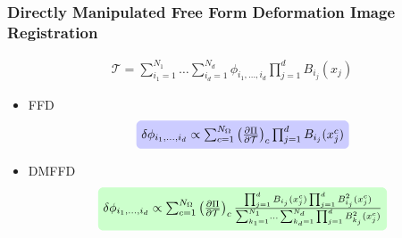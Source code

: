 \documentclass[xcolor=dvipsnames,serif,10pt]{beamer}
\begin{document}




\begin{frame}
\frametitle{Directly Manipulated Free Form Deformation Image Registration}
\begin{align*}
\mathcal{T} = \sum_{i_1=1}^{N_1}\ldots\sum_{i_d=1}^{N_d} \phi_{i_1,\ldots,i_d} \prod_{j=1}^d B_{i_j}(x_j) \nonumber
\end{align*}

\begin{itemize}
\item FFD
\begin{equation*}
\tikz[baseline]{
  \node[fill=blue!20,anchor=base,rounded corners, inner sep=4pt, inner ysep=4pt] (t1)
  {$\delta \phi_{i_1,\ldots,i_d} \propto \sum_{c=1}^{N_\Omega} \left( \frac{\partial \Pi}{\partial \mathcal{T}}\right)_c\prod_{j=1}^d B_{i_j}(x^c_j)$};
}  
\end{equation*}
\end{itemize}

\begin{itemize}
\item DMFFD
\begin{equation*}
\tikz[baseline]{
  \node[fill=green!20,anchor=base, rounded corners, inner sep=4pt, inner ysep=4pt] (t2)
{$\delta \phi_{i_1,\ldots,i_d} \propto \sum_{c=1}^{N_\Omega} \left( \frac{\partial \Pi}{\partial \mathcal{T}}\right)_c \frac{\prod_{j=1}^d B_{i_j}(x^c_j) \prod_{j=1}^d B_{i_j}^2 (x_j^c)}{\sum_{k_1=1}^{N_1}\ldots\sum_{k_d=1}^{N_d} \prod_{j=1}^d B_{k_j}^2 (x_j^c)}$};
}
\end{equation*}
\end{itemize}

\end{frame}

\end{document}
